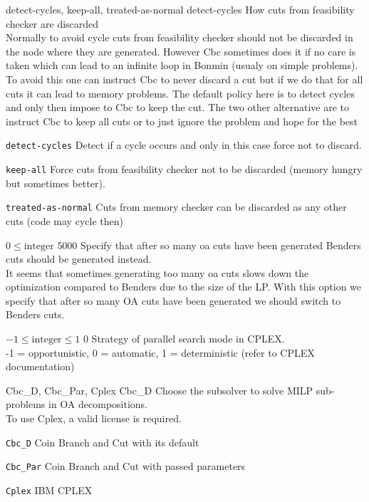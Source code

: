 %
{\ttfamily detect-cycles, keep-all, treated-as-normal}%
{detect-cycles}%
{How cuts from feasibility checker are discarded\\
Normally to avoid cycle cuts from feasibility checker should not be discarded in the node where they are generated. However Cbc sometimes does it if no care is taken which can lead to an infinite loop in Bonmin (usualy on simple problems). To avoid this one can instruct Cbc to never discard a cut but if we do that for all cuts it can lead to memory problems. The default policy here is to detect cycles and only then impose to Cbc to keep the cut. The two other alternative are to instruct Cbc to keep all cuts or to just ignore the problem and hope for the best}%
{\begin{list}{}{
\setlength{\parsep}{0em}
\setlength{\leftmargin}{5ex}
\setlength{\labelwidth}{2ex}
\setlength{\itemindent}{0ex}
\setlength{\topsep}{0pt}}
\item[\texttt{detect-cycles}] Detect if a cycle occurs and only in this case force not to discard.
\item[\texttt{keep-all}] Force cuts from feasibility checker not to be discarded (memory hungry but sometimes better).
\item[\texttt{treated-as-normal}] Cuts from memory checker can be discarded as any other cuts (code may cycle then)
\end{list}
}

%
{$0\leq\textrm{integer}$}%
{$5000$}%
{Specify that after so many oa cuts have been generated Benders cuts should be generated instead.\\
It seems that sometimes generating too many oa cuts slows down the optimization compared to Benders due to the size of the LP. With this option we specify that after so many OA cuts have been generated we should switch to Benders cuts.}%
{}

%
{$-1\leq\textrm{integer}\leq1$}%
{$0$}%
{Strategy of parallel search mode in CPLEX.\\
-1 = opportunistic, 0 = automatic, 1 = deterministic (refer to CPLEX documentation)}%
{}

%
{Cbc\_D, Cbc\_Par, Cplex}%
{Cbc\_D}%
{Choose the subsolver to solve MILP sub-problems in OA decompositions.\\
 To use Cplex, a valid license is required.}%
{\begin{list}{}{
\setlength{\parsep}{0em}
\setlength{\leftmargin}{5ex}
\setlength{\labelwidth}{2ex}
\setlength{\itemindent}{0ex}
\setlength{\topsep}{0pt}}
\item[\texttt{Cbc\_D}] Coin Branch and Cut with its default
\item[\texttt{Cbc\_Par}] Coin Branch and Cut with passed parameters
\item[\texttt{Cplex}] IBM CPLEX
\end{list}
}

